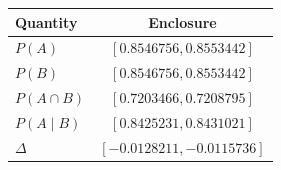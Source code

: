 \begin{tabular}{lc}\toprule Quantity & Enclosure\\\midrule
$P(A)$ & $[0.8546756, 0.8553442]$ \\
$P(B)$ & $[0.8546756, 0.8553442]$ \\
$P(A\cap B)$ & $[0.7203466, 0.7208795]$ \\
$P(A\mid B)$ & $[0.8425231, 0.8431021]$ \\
$\Delta$ & $[-0.0128211, -0.0115736]$ \\
\bottomrule\end{tabular}
